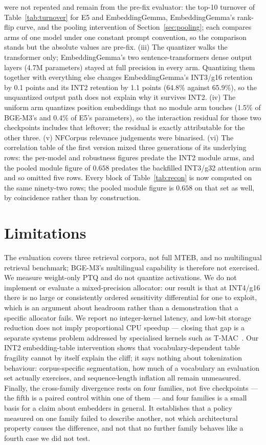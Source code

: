 \documentclass[11pt]{article}
\begin{document}
were not repeated and remain from the pre-fix evaluator: the top-10 turnover of
Table~\ref{tab:turnover} for E5 and EmbeddingGemma, EmbeddingGemma's rank-flip curve, and the
pooling intervention of Section~\ref{sec:pooling}; each compares arms of one model under one
constant prompt convention, so the comparison stands but the absolute values are pre-fix.
(iii) The quantizer walks the transformer only; EmbeddingGemma's two sentence-transformers
dense output layers (4.7M parameters) stayed at full precision in every arm. Quantizing them
together with everything else changes EmbeddingGemma's INT3/g16 retention by 0.1 points and
its INT2 retention by 1.1 points (64.8\% against 65.9\%), so the unquantized output path does
not explain why it survives INT2. (iv) The uniform arm
quantizes position embeddings that no module arm touches (1.5\% of BGE-M3's and 0.4\% of
E5's parameters), so the interaction residual for those two checkpoints includes that
leftover; the residual is exactly attributable for the other three. (v) NFCorpus relevance
judgements were binarised. (vi) The correlation table of the first version mixed three
generations of its underlying rows: the per-model and robustness figures predate the INT2
module arms, and the pooled module figure of $0.658$ predates the backfilled INT3/g32
attention arm and so omitted five rows. Every block of Table~\ref{tab:recon} is now computed
on the same ninety-two rows; the pooled module figure is $0.658$ on that set as well, by
coincidence rather than by construction.

\section{Limitations}
\label{sec:limitations}

The evaluation covers three retrieval corpora, not full MTEB, and no multilingual retrieval
benchmark; BGE-M3's multilingual capability is therefore not exercised. We measure
weight-only PTQ and do not quantize activations. We do not implement or evaluate a
mixed-precision allocator: our result is that at INT4/g16 there is no large or consistently
ordered sensitivity differential for one to exploit, which is an argument about headroom rather than a
demonstration that a specific allocator fails. We report no integer-kernel latency, and low-bit storage reduction does not imply
proportional CPU speedup --- closing that gap is a separate systems problem addressed by
specialised kernels such as T-MAC~\cite{tmac}. Our INT2 embedding-table intervention shows that
vocabulary-dependent table fragility cannot by itself explain the cliff; it says nothing about
tokenization behaviour: corpus-specific segmentation,
how much of a vocabulary an evaluation set actually exercises, and sequence-length inflation all
remain unmeasured. Finally,
the cross-family divergence rests on four families, not five checkpoints --- the
fifth is a paired control within one of them --- and four families is a small basis for a
claim about embedders in general. It establishes that a policy measured on one family failed
to describe another, not which architectural property causes the difference, and not that no
further family behaves like a fourth case we did not test.
\end{document}
